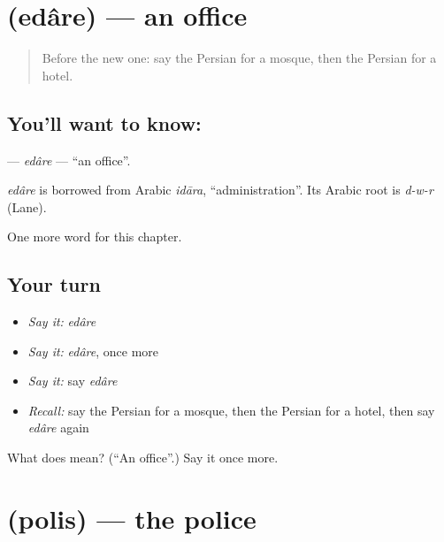 \section[\texorpdfstring{\fa{اداره} (edâre)}{اداره (edâre)}]{ (edâre) — an office}

\label{lesson:FA-C71-edare}



\begin{quote}
Before the new one: say the Persian for a mosque, then the Persian for a hotel.
\end{quote}

\subsection*{You'll want to know: }
\textbf{} — \emph{edâre} — \textquotedblleft{}an office\textquotedblright{}.

\begin{cousinweb}
\emph{edâre} is borrowed from Arabic \emph{idāra}, \textquotedblleft{}administration\textquotedblright{}. Its Arabic root is \emph{d-w-r} (Lane).
\end{cousinweb}

\begin{grammarlens}[title={What you've built}]
One more word for this chapter.
\end{grammarlens}

\subsection*{Your turn}
\begin{itemize}
\raggedright
  \item \emph{Say it:} \emph{edâre}
  \item \emph{Say it:} \emph{edâre}, once more
  \item \emph{Say it:} say \emph{edâre}
  \item \emph{Recall:} say the Persian for a mosque, then the Persian for a hotel, then say \emph{edâre} again
\end{itemize}

\begin{tcolorbox}[breakable,colback=teal!4,colframe=teal!35!black,title={Before you move on}]
What does  mean? (\textquotedblleft{}An office\textquotedblright{}.) Say it once more.
\end{tcolorbox}
\section[\texorpdfstring{\fa{پلیس} (polis)}{پلیس (polis)}]{ (polis) — the police}

